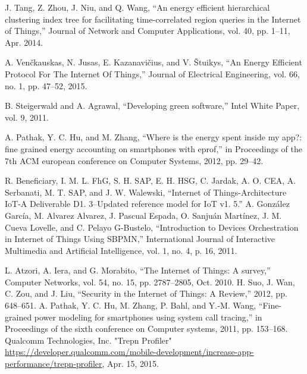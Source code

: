 \documentclass[journal]{IEEEtran}
\begin{document}
\begin{thebibliography}{9}
J. Tang, Z. Zhou, J. Niu, and Q. Wang, “An energy efficient hierarchical clustering index tree for facilitating time-correlated region queries in the Internet of Things,” Journal of Network and Computer Applications, vol. 40, pp. 1–11, Apr. 2014.

A. Venčkauskas, N. Jusas, E. Kazanavičius, and V. Štuikys, “An Energy Efficient Protocol For The Internet Of Things,” Journal of Electrical Engineering, vol. 66, no. 1, pp. 47–52, 2015.

B. Steigerwald and A. Agrawal, “Developing green software,” Intel White Paper, vol. 9, 2011.

A. Pathak, Y. C. Hu, and M. Zhang, “Where is the energy spent inside my app?: fine grained energy accounting on smartphones with eprof,” in Proceedings of the 7th ACM european conference on Computer Systems, 2012, pp. 29–42.

R. Beneficiary, I. M. L. FhG, S. H. SAP, E. H. HSG, C. Jardak, A. O. CEA, A. Serbanati, M. T. SAP, and J. W. Walewski, “Internet of Things-Architecture IoT-A Deliverable D1. 3–Updated reference model for IoT v1. 5.”
A. González García, M. Alvarez Alvarez, J. Pascual Espada, O. Sanjuán Martínez, J. M. Cueva Lovelle, and C. Pelayo G-Bustelo, “Introduction to Devices Orchestration in Internet of Things Using SBPMN,” International Journal of Interactive Multimedia and Artificial Intelligence, vol. 1, no. 4, p. 16, 2011.

L. Atzori, A. Iera, and G. Morabito, “The Internet of Things: A survey,” Computer Networks, vol. 54, no. 15, pp. 2787–2805, Oct. 2010.
H. Suo, J. Wan, C. Zou, and J. Liu, “Security in the Internet of Things: A Review,” 2012, pp. 648–651.
A. Pathak, Y. C. Hu, M. Zhang, P. Bahl, and Y.-M. Wang, “Fine-grained power modeling for smartphones using system call tracing,” in Proceedings of the sixth conference on Computer systems, 2011, pp. 153–168.
Qualcomm Technologies, Inc. "Trepn Profiler" \url{https://developer.qualcomm.com/mobile-development/increase-app-performance/trepn-profiler}, Apr. 15, 2015.

\end{thebibliography}

\end{document}
